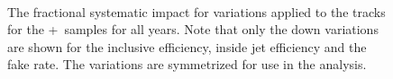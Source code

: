 \begin{figure}[h!]
  \centering
   \\
  \caption{The fractional systematic impact for variations applied to the tracks for the \powheg+\pythia~samples for all years. Note that only the down variations are shown for the inclusive efficiency, inside jet efficiency and the fake rate.
  The variations are symmetrized for use in the analysis.}
  \label{fig:PP8TrackSyst}
\end{figure}

